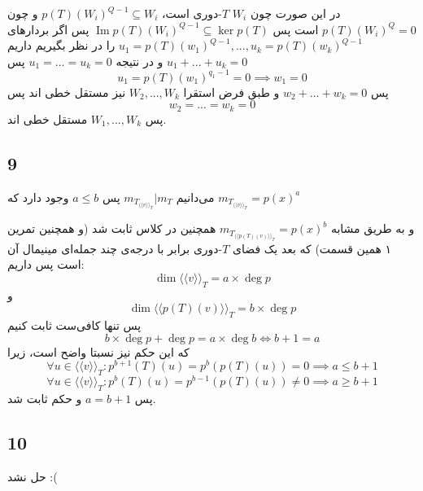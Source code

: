 \documentclass[12pt,a4paper]{article}
\DeclareMathOperator{\im}{Im}
\newcommand{\dori}[1]{{\langle\langle {#1} \rangle\rangle_{T}}}
\begin{document}
در این صورت چون $W_i$ $T$-دوری است، 
$p(T)(W_i)^{Q-1} \subseteq W_i$
 و چون $p(T)(W_i)^Q = 0$ است پس 
$\im p(T)(W_i)^{Q-1} \subseteq \ker p(T)$
پس اگر بردارهای 
$u_1 = p(T)(w_1)^{Q-1}, ..., u_k = p(T)(w_k)^{Q-1}$
را در نظر بگیریم داریم $u_1 + ... + u_k = 0$ و در نتیجه $u_1 = ... = u_k = 0$ پس 
$$u_1 = p(T)(w_1)^{q_1 - 1} = 0 \implies w_1 = 0$$
پس $w_2 + ... + w_k = 0$ و طبق فرض استقرا $W_2, ..., W_k$ نیز مستقل خطی اند پس 
$$w_2 = ... = w_k = 0$$
پس $W_1, ..., W_k$ مستقل خطی اند.
\subsection{9}
می‌دانیم 
$m_{T_\dori{v}}|m_T$
 پس $a \leq b$ وجود دارد که 
$m_{T_\dori{v}} = p(x)^a$

و به طریق مشابه 
$m_{T_\dori{p(T)(v)}} = p(x)^b$
همچنین در کلاس ثابت شد (و همچنین تمرین ۱ همین قسمت) که بعد یک فضای $T$-دوری برابر با درجه‌ی چند جمله‌ای مینیمال آن است پس داریم:
$$\dim \dori{v} = a \times \deg p$$
و
$$\dim \dori{p(T)(v)} = b \times \deg p$$
پس تنها کافی‌ست ثابت کنیم
$$
b\times \deg p + \deg p = a \times \deg b \iff b+1 = a
$$
که این حکم نیز نسبتا واضح است، زیرا 
$$
\forall u \in \dori{v}: p^{b+1}(T)(u) = p^b(p(T)(u)) = 0 \implies a \leq b+1
$$
$$
\forall u \in \dori{v}: p^b(T)(u) = p^{b-1}(p(T)(u)) \neq 0 \implies a \geq b+1
$$
پس $a = b+1$ و حکم ثابت شد.
\subsection{10}
حل نشد :(
\end{document}
